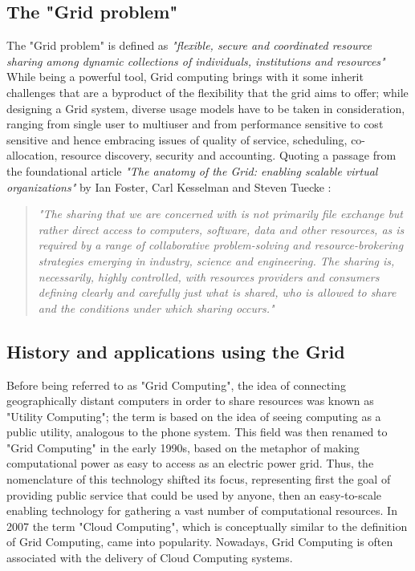 \subsection{The "Grid problem"}
The "Grid problem" is defined as \textit{"flexible, secure and coordinated resource sharing among dynamic collections of individuals, institutions and resources"} \cite{the_anatomy_of_the_grid}
 While being a powerful tool, Grid computing brings with it some inherit challenges that are a byproduct of the flexibility that the grid aims to offer; while designing a Grid system, diverse usage models have to be taken in consideration, ranging from single user to multiuser and from performance sensitive to cost sensitive and hence embracing issues of quality of service, scheduling, co-allocation, resource discovery, security and accounting.
 Quoting a passage from the foundational article \textit{"The anatomy of the Grid: enabling scalable virtual organizations"} by Ian Foster, Carl Kesselman and Steven Tuecke \cite{the_anatomy_of_the_grid}:
\begin{quotation}
    \textit{"The sharing that we are concerned with is not primarily file exchange but rather direct access to computers, software, data and other resources, as is required by a range of collaborative problem-solving and resource-brokering strategies emerging in industry, science and engineering. The sharing is, necessarily, highly controlled, with resources providers and consumers defining clearly and carefully just what is shared, who is allowed to share and the conditions under which sharing occurs."}
\end{quotation}


\subsection{History and applications using the Grid}
Before being referred to as "Grid Computing", the idea of connecting geographically distant computers in order to share resources was known as "Utility Computing"; the term is based on the idea of seeing computing as a public utility, analogous to the phone system. This field was then renamed to "Grid Computing" in the early 1990s, based on the metaphor of making computational power as easy to access as an electric power grid.
Thus, the nomenclature of this technology shifted its focus, representing first the goal of providing public service that could be used by anyone, then an easy-to-scale enabling technology for gathering a vast number of computational resources. In 2007 the term "Cloud Computing", which is conceptually similar to the definition of Grid Computing, came into popularity. Nowadays, Grid Computing is often associated with the delivery of Cloud Computing systems.
\vspace{5mm}

